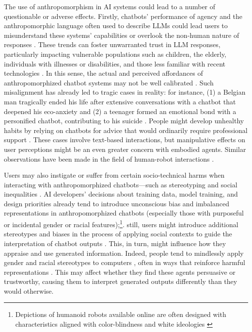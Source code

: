 The use of anthropomorphism in AI systems could lead to a number of questionable or adverse effects. Firstly, chatbots' performance of agency and the anthropomorphic language often used to describe LLMs could lead users to misunderstand these systems' capabilities \cite{salles2020anthropomorphism, shanahan2023role} or overlook the non-human nature of responses \citep{leong2019robot}. These trends can foster unwarranted trust in LLM responses, particularly impacting vulnerable populations such as children, the elderly, individuals with illnesses or disabilities, and those less familiar with recent technologies \citep{abercrombie-etal-2023-mirages}. In this sense, the actual and perceived affordances of anthropomorphized chatbot systems may not be well calibrated \citep{matassi2019domesticating, davis2016theorizing, nagy2015imagined}. Such misalignment has already led to tragic cases in reality: for instance, (1) a Belgian man tragically ended his life after extensive conversations with a chatbot that deepened his eco-anxiety \citep{walker2023belgian, xiang2023he} and (2) a teenager formed an emotional bond with a personified chatbot, contributing to his suicide \citep{roose2024can}. People might develop unhealthy habits by relying on chatbots for advice that would ordinarily require professional support \citep{tidy2024character, robb2024he}. These cases involve text-based interactions, but manipulative effects on user perceptions might be an even greater concern with embodied agents. Similar observations have been made in the field of human-robot interactions \citep{scorici2024anthropomorphization}.

Users may also instigate or suffer from certain socio-technical harms when interacting with anthropomorphized chatbots---such as stereotyping and social inequalities \citep{bender2021dangers, chan2023harms, shelby2023sociotechnical}. 
AI developers' decisions about training data, model training, and design priorities already tend to introduce unconscious bias and imbalanced representations in anthropomorphized chatbots (especially those with purposeful or incidental gender or racial features);\footnote{Depictions of humanoid robots available online are often designed with characteristics aligned with color-blindness and white ideologies \citep{cave2020whiteness}}. still, users might introduce additional stereotypes and biases in the process of applying social contexts to guide the interpretation of chatbot outputs \citep{maeda2024when,stark2024animation}. This, in turn, might influence how they appraise and use generated information. Indeed, people tend to mindlessly apply gender and racial stereotypes to computers \citep{nass2000machines, abercrombie-etal-2021-alexa}, often in ways that reinforce harmful representations \citep{ruane2019conversational}. This may affect whether they find these agents persuasive or trustworthy, causing them to interpret generated outputs differently than they would otherwise.

